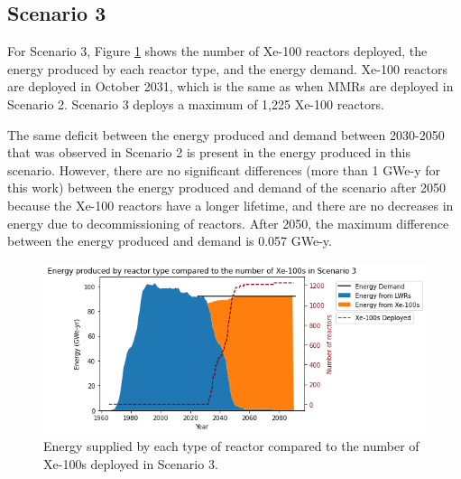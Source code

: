 \documentclass[preprint]{elsarticle}
\providecommand{\DIFaddbeginFL}{} %
\providecommand{\DIFaddendFL}{} %
\providecommand{\DIFdelbeginFL}{} %
\providecommand{\DIFdelendFL}{} %
\begin{document}
\subsection{Scenario 3}
For Scenario 3, Figure \ref{fig:energy_rx_3} shows the number of Xe-100 reactors deployed, 
the energy produced by each reactor type, and the energy demand. 
Xe-100 reactors are deployed in October 2031, which is the same as when 
\glspl{MMR}
are deployed in Scenario 2. Scenario 3 deploys a maximum of 1,225 Xe-100 
reactors.

The same deficit between the energy produced and demand between 
2030-2050 that was observed in Scenario 2 is present in the energy produced 
in this scenario. However, there are no significant 
differences (more than 1 GWe-y for this work) between the energy 
produced and demand of the scenario 
after 2050 because the Xe-100 reactors have a longer lifetime, and there are 
no decreases in energy due to decommissioning of reactors. After 2050, the 
maximum difference between the energy produced and demand is 0.057 GWe-y. 

\begin{figure}
    \centering 
    \DIFdelbeginFL %
\DIFdelendFL \DIFaddbeginFL \includegraphics[width=\textwidth]{../figures/energy_scenario3.png}
    \DIFaddendFL \caption{Energy supplied by each type of reactor compared to the number of 
    Xe-100s deployed in Scenario 3.}
    \label{fig:energy_rx_3}
\end{figure}
\end{document}
